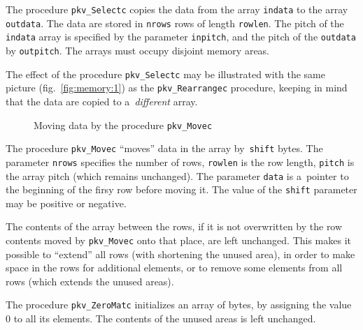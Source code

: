 \vspace{\bigskipamount}
The procedure \texttt{pkv\_Selectc} copies the data from the array \texttt{indata}
to the array \texttt{outdata}. The data are stored in \texttt{nrows} rows
of length \texttt{rowlen}. The pitch of the \texttt{indata} array is
specified by the parameter \texttt{inpitch}, and the pitch of the
\texttt{outdata} by \texttt{outpitch}. The arrays must occupy disjoint
memory areas.

The effect of the procedure \texttt{pkv\_Selectc} may be illustrated with the same
picture (fig.~\ref{fig:memory:1}) as the \texttt{pkv\_Rearrangec} procedure,
keeping in mind that the data are copied to a~\emph{different} array.

\begin{figure}[ht]
  \centerline{}
  \caption{\label{fig:memory:2}Moving data by the procedure \texttt{pkv\_Movec}}
\end{figure}
\vspace{\bigskipamount}
The procedure \texttt{pkv\_Movec} ``moves'' data in the array
by~\texttt{shift} bytes. The parameter \texttt{nrows} specifies the number of
rows, \texttt{rowlen} is the row length, \texttt{pitch} is the array
pitch (which remains unchanged). The parameter
\texttt{data} is a~pointer to the beginning of the firsy row before
moving it. The value of the \texttt{shift} parameter may be positive or
negative.

The contents of the array between the rows, if it is not overwritten by
the row contents moved by \texttt{pkv\_Movec} onto that place, are left
unchanged. This makes it possible to ``extend'' all rows (with shortening
the unused area), in order to make space in the rows for additional elements,
or to remove some elements from all rows (which extends the unused areas).

\newpage
The procedure \texttt{pkv\_ZeroMatc} initializes an array of bytes, by
assigning the value~$0$ to all its elements. The contents of the unused areas
is left unchanged.

